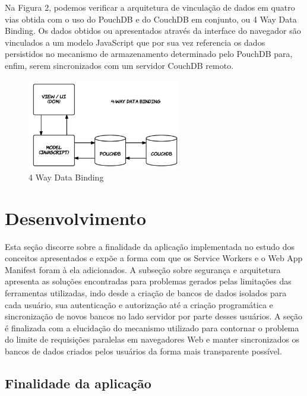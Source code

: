 \documentclass[
	article,			%
	12pt,				%
	oneside,			%
	a4paper,			%
	english,			%
	brazil,				%
	sumario=tradicional
	]{abntex2}
\begin{document}
Na Figura 2, podemos verificar a arquitetura de vinculação de dados em quatro vias obtida com o uso do PouchDB e do CouchDB em conjunto, ou 4 Way Data Binding. Os dados obtidos ou apresentados através da interface do navegador são vinculados a um modelo JavaScript que por sua vez referencia os dados persistidos no mecanismo de armazenamento determinado pelo PouchDB para, enfim, serem sincronizados com um servidor CouchDB remoto.

\begin{figure}[H]
	\label{4 Way Data Binding}
	\centering
	\caption{4 Way Data Binding}
	\includegraphics[width=0.6\textwidth]{figures/4way-binding}
\end{figure}


\section{Desenvolvimento}

Esta seção discorre sobre a finalidade da aplicação implementada no estudo dos conceitos apresentados e expõe a forma com que os Service Workers e o Web App Manifest foram à ela adicionados. A subseção sobre segurança e arquitetura apresenta as soluções encontradas para problemas gerados pelas limitações das ferramentas utilizadas, indo desde a criação de bancos de dados isolados para cada usuário, sua autenticação e autorização até a criação programática e sincronização de novos bancos no lado servidor por parte desses usuários. A seção é finalizada com a elucidação do mecanismo utilizado para contornar o problema do limite de requisições paralelas em navegadores Web e manter sincronizados os bancos de dados criados pelos usuários da forma mais transparente possível.

\subsection{Finalidade da aplicação}
\end{document}
